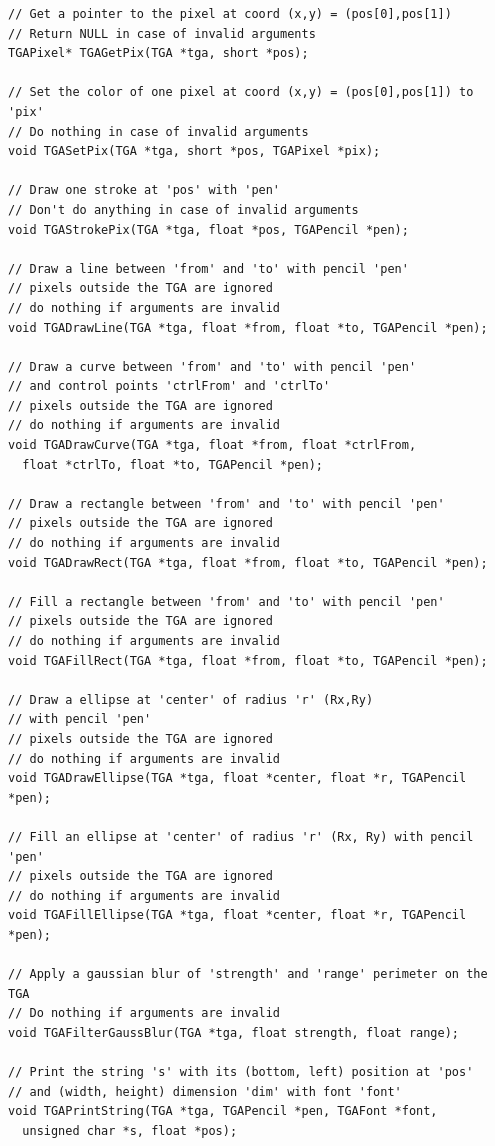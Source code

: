 \documentclass[12pt, a4paper]{article}
\begin{document}
\begin{scriptsize}
\begin{ttfamily}
\begin{lstlisting}
// Get a pointer to the pixel at coord (x,y) = (pos[0],pos[1])
// Return NULL in case of invalid arguments
TGAPixel* TGAGetPix(TGA *tga, short *pos);

// Set the color of one pixel at coord (x,y) = (pos[0],pos[1]) to 'pix'
// Do nothing in case of invalid arguments
void TGASetPix(TGA *tga, short *pos, TGAPixel *pix);

// Draw one stroke at 'pos' with 'pen'
// Don't do anything in case of invalid arguments
void TGAStrokePix(TGA *tga, float *pos, TGAPencil *pen);

// Draw a line between 'from' and 'to' with pencil 'pen'
// pixels outside the TGA are ignored
// do nothing if arguments are invalid
void TGADrawLine(TGA *tga, float *from, float *to, TGAPencil *pen);
  
// Draw a curve between 'from' and 'to' with pencil 'pen'
// and control points 'ctrlFrom' and 'ctrlTo'
// pixels outside the TGA are ignored
// do nothing if arguments are invalid
void TGADrawCurve(TGA *tga, float *from, float *ctrlFrom, 
  float *ctrlTo, float *to, TGAPencil *pen);
  
// Draw a rectangle between 'from' and 'to' with pencil 'pen'
// pixels outside the TGA are ignored
// do nothing if arguments are invalid
void TGADrawRect(TGA *tga, float *from, float *to, TGAPencil *pen);

// Fill a rectangle between 'from' and 'to' with pencil 'pen'
// pixels outside the TGA are ignored
// do nothing if arguments are invalid
void TGAFillRect(TGA *tga, float *from, float *to, TGAPencil *pen);

// Draw a ellipse at 'center' of radius 'r' (Rx,Ry) 
// with pencil 'pen' 
// pixels outside the TGA are ignored
// do nothing if arguments are invalid
void TGADrawEllipse(TGA *tga, float *center, float *r, TGAPencil *pen);

// Fill an ellipse at 'center' of radius 'r' (Rx, Ry) with pencil 'pen'
// pixels outside the TGA are ignored
// do nothing if arguments are invalid
void TGAFillEllipse(TGA *tga, float *center, float *r, TGAPencil *pen);

// Apply a gaussian blur of 'strength' and 'range' perimeter on the TGA
// Do nothing if arguments are invalid 
void TGAFilterGaussBlur(TGA *tga, float strength, float range);

// Print the string 's' with its (bottom, left) position at 'pos'
// and (width, height) dimension 'dim' with font 'font'
void TGAPrintString(TGA *tga, TGAPencil *pen, TGAFont *font, 
  unsigned char *s, float *pos);


\end{lstlisting}
\end{ttfamily}
\end{scriptsize}
\end{document}
